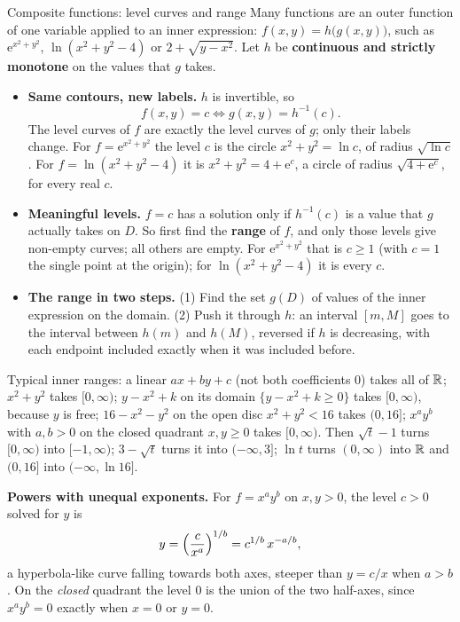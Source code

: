 \begin{rulebox}{Composite functions: level curves and range}
Many functions are an outer function of one variable applied to an inner
expression: $f(x,y)=h\bigl(g(x,y)\bigr)$, such as
$\mathrm{e}^{x^{2}+y^{2}}$, $\ln(x^{2}+y^{2}-4)$ or $2+\sqrt{y-x^{2}}$.
Let $h$ be \textbf{continuous and strictly monotone} on the values that $g$
takes.
\begin{itemize}[leftmargin=1.6em,itemsep=0.3ex]
  \item \textbf{Same contours, new labels.} $h$ is invertible, so
        \[
          f(x,y)=c\iff g(x,y)=h^{-1}(c) .
        \]
        The level curves of $f$ are exactly the level curves of $g$; only
        their labels change. For $f=\mathrm{e}^{x^{2}+y^{2}}$ the level $c$
        is the circle $x^{2}+y^{2}=\ln c$, of radius $\sqrt{\ln c}$. For
        $f=\ln(x^{2}+y^{2}-4)$ it is $x^{2}+y^{2}=4+\mathrm{e}^{c}$, a
        circle of radius $\sqrt{4+\mathrm{e}^{c}}$, for every real $c$.
  \item \textbf{Meaningful levels.} $f=c$ has a solution only if
        $h^{-1}(c)$ is a value that $g$ actually takes on $D$. So first
        find the \textbf{range} of $f$, and only those levels give
        non-empty curves; all others are empty. For
        $\mathrm{e}^{x^{2}+y^{2}}$ that is $c\ge1$ (with $c=1$ the single
        point at the origin); for $\ln(x^{2}+y^{2}-4)$ it is every $c$.
  \item \textbf{The range in two steps.} (1) Find the set $g(D)$ of
        values of the inner expression on the domain. (2) Push it through
        $h$: an interval $[m,M]$ goes to the interval between $h(m)$ and
        $h(M)$, reversed if $h$ is decreasing, with each endpoint included
        exactly when it was included before.
\end{itemize}
Typical inner ranges: a linear $ax+by+c$ (not both coefficients $0$) takes
all of $\mathbb{R}$; $x^{2}+y^{2}$ takes $[0,\infty)$; $y-x^{2}+k$ on its domain
$\{y-x^{2}+k\ge0\}$ takes $[0,\infty)$, because $y$ is free; $16-x^{2}-y^{2}$
on the open disc $x^{2}+y^{2}<16$ takes $(0,16]$; $x^{a}y^{b}$ with
$a,b>0$ on the closed quadrant $x,y\ge0$ takes $[0,\infty)$. Then
$\sqrt{t}-1$ turns $[0,\infty)$ into $[-1,\infty)$; $3-\sqrt t$ turns it
into $(-\infty,3]$; $\ln t$ turns $(0,\infty)$ into $\mathbb{R}$ and $(0,16]$ into
$(-\infty,\ln16]$.

\textbf{Powers with unequal exponents.} For $f=x^{a}y^{b}$ on $x,y>0$, the
level $c>0$ solved for $y$ is
\[
  y=\Bigl(\frac{c}{x^{a}}\Bigr)^{1/b}=c^{1/b}\,x^{-a/b},
\]
a hyperbola-like curve falling towards both axes, steeper than
$y=c/x$ when $a>b$. On the \emph{closed} quadrant the level $0$ is the
union of the two half-axes, since $x^{a}y^{b}=0$ exactly when $x=0$ or
$y=0$.
\end{rulebox}

